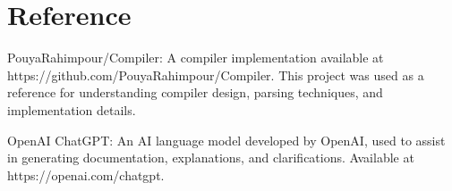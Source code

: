 \documentclass[12pt, a4paper]{report}
\begin{document}
\chapter{Reference}

PouyaRahimpour/Compiler: 
A compiler implementation available at https://github.com/PouyaRahimpour/Compiler. This project was used as a reference for understanding compiler design, parsing techniques, and implementation details.

OpenAI ChatGPT: 
An AI language model developed by OpenAI, used to assist in generating documentation, explanations, and clarifications. Available at https://openai.com/chatgpt.
\end{document}

